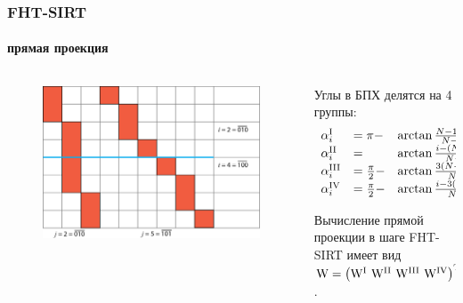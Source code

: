\begin{frame}
\frametitle{FHT-SIRT}
\framesubtitle{прямая проекция}
\begin{columns}[T,onlytextwidth]
  \hspace*{-0.5cm}
  \begin{column}{0.65\textwidth}
  \begin{figure}
    \includegraphics[width=\textwidth]{../Dissertation/images/part1_img/pattern_structure}
  \end{figure}
  \end{column}
  \begin{column}{0.45\textwidth}
    Углы в БПХ делятся на 4 группы:
    \begin{equation} \notag
    \begin{array}{lll}
    \alpha^\rom{1}_i &= \pi - & \arctan{\frac{N-1-i}{N-1}} \\
    \alpha^\rom{2}_i &= &\arctan{\frac{i - (N-1)}{N-1}} \\
    \alpha^\rom{3}_i &= \frac \pi 2 - & \arctan{\frac{3(N-1)-i}{N-1}} \\
    \alpha^\rom{4}_i &= \frac \pi 2 - & \arctan{\frac{i - 3(N-1)}{N-1}}
    \end{array}
    \end{equation}

    Вычисление прямой проекции в шаге FHT-SIRT имеет вид 
        $\mathrm W = \left( \mathrm  W^\rom{1}\ \mathrm W^\rom{2}\ \mathrm  W^\rom{3}\ \mathrm  W^\rom{4} \right)^{\mathrm T}$.
  \end{column}
\end{columns}
\end{frame}


